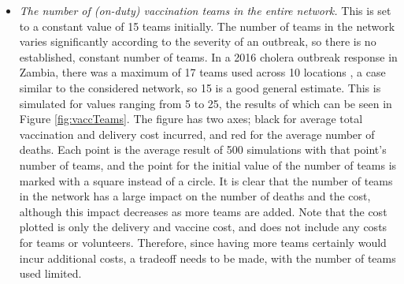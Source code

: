 \begin{itemize}
    \item \textit{The number of (on-duty) vaccination teams in the entire network.} This is set to a constant value of 15 teams initially. The number of teams in the network varies significantly according to the severity of an outbreak, so there is no established, constant number of teams. In a 2016 cholera outbreak response in Zambia, there was a maximum of 17 teams used across 10 locations \cite{poncin2018implementation}, a case similar to the considered network, so 15 is a good general estimate. This is simulated for values ranging from 5 to 25, the results of which can be seen in Figure \ref{fig:vaccTeams}. The figure has two axes; black for average total vaccination and delivery cost incurred, and red for the average number of deaths. Each point is the average result of 500 simulations with that point's number of teams, and the point for the initial value of the number of teams is marked with a square instead of a circle. It is clear that the number of teams in the network has a large impact on the number of deaths and the cost, although this impact decreases as more teams are added. Note that the cost plotted is only the delivery and vaccine cost, and does not include any costs for teams or volunteers. Therefore, since having more teams certainly would incur additional costs, a tradeoff needs to be made, with the number of teams used limited.
    

\end{itemize}
